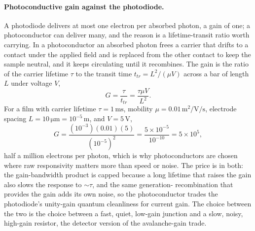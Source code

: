 \paragraph{Photoconductive gain against the photodiode.}
A photodiode delivers at most one electron per absorbed photon, a gain of
one; a photoconductor can deliver many, and the reason is a lifetime-transit
ratio worth carrying. In a photoconductor an absorbed photon frees a
carrier that drifts to a contact under the applied field and is replaced from
the other contact to keep the sample neutral, and it keeps circulating until
it recombines. The gain is the ratio of the carrier lifetime $\tau$ to the
transit time $t_{tr} = L^{2}/(\mu V)$ across a bar of length $L$ under
voltage $V$,
\[
G = \frac{\tau}{t_{tr}} = \frac{\tau\mu V}{L^{2}}.
\]
For a film with carrier lifetime $\tau = 1\,\si{\milli\second}$, mobility
$\mu = 0.01\,\si{\meter\squared\per\volt\per\second}$, electrode spacing
$L = 10\,\si{\micro\meter} = 10^{-5}\,\si{\meter}$, and $V = 5\,\si{\volt}$,
\[
G = \frac{(10^{-3})(0.01)(5)}{(10^{-5})^{2}}
  = \frac{5\times 10^{-5}}{10^{-10}}
  = 5\times 10^{5},
\]
half a million electrons per photon, which is why photoconductors are chosen
where raw responsivity matters more than speed or noise. The price is in both:
the gain-bandwidth product is capped because a long lifetime that raises the
gain also slows the response to $\sim\tau$, and the same generation-
recombination that provides the gain adds its own noise, so the
photoconductor trades the photodiode's unity-gain quantum cleanliness for
current gain. The choice between the two is the choice between a fast, quiet,
low-gain junction and a slow, noisy, high-gain resistor, the detector version
of the avalanche-gain trade.

